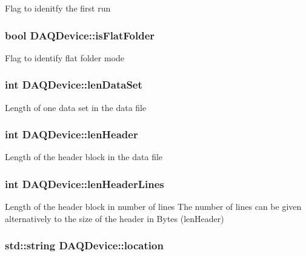 Flag to idenitfy the first run \hypertarget{classDAQDevice_a4431ebea220a683acb12ce0f78e87927}{
\subsubsection[{is\-Flat\-Folder}]{\setlength{\rightskip}{0pt plus 5cm}bool D\-A\-Q\-Device\-::is\-Flat\-Folder\hspace{0.3cm}{\ttfamily [protected]}}}\label{classDAQDevice_a4431ebea220a683acb12ce0f78e87927}
Flag to identify flat folder mode \hypertarget{classDAQDevice_ae6cf89824f15528d92fe1e31b2dacf59}{
\subsubsection[{len\-Data\-Set}]{\setlength{\rightskip}{0pt plus 5cm}int D\-A\-Q\-Device\-::len\-Data\-Set\hspace{0.3cm}{\ttfamily [protected]}}}\label{classDAQDevice_ae6cf89824f15528d92fe1e31b2dacf59}
Length of one data set in the data file \hypertarget{classDAQDevice_a91b1652c6ca593eaf3f04e3118cd2420}{
\subsubsection[{len\-Header}]{\setlength{\rightskip}{0pt plus 5cm}int D\-A\-Q\-Device\-::len\-Header\hspace{0.3cm}{\ttfamily [protected]}}}\label{classDAQDevice_a91b1652c6ca593eaf3f04e3118cd2420}
Length of the header block in the data file \hypertarget{classDAQDevice_a155e6dba34521962283c83f1bda63799}{
\subsubsection[{len\-Header\-Lines}]{\setlength{\rightskip}{0pt plus 5cm}int D\-A\-Q\-Device\-::len\-Header\-Lines\hspace{0.3cm}{\ttfamily [protected]}}}\label{classDAQDevice_a155e6dba34521962283c83f1bda63799}
Length of the header block in number of lines The number of lines can be given alternatively to the size of the header in Bytes (len\-Header) \hypertarget{classDAQDevice_aab09bfdbb1d0aa4b413e4bbbc5e3c5a6}{
\subsubsection[{location}]{\setlength{\rightskip}{0pt plus 5cm}std\-::string D\-A\-Q\-Device\-::location\hspace{0.3cm}{\ttfamily [private]}}}\label{classDAQDevice_aab09bfdbb1d0aa4b413e4bbbc5e3c5a6}
